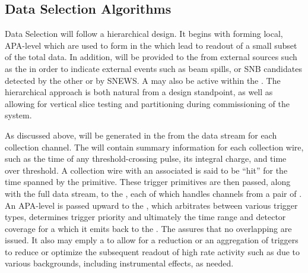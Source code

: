 \subsection{Data Selection Algorithms}
\label{sec:fdsp-daq-sel}




Data Selection will follow a hierarchical design. 
It begins with forming local, APA-level  which
are used to form   in the
 which lead to readout of a small subset of the total data. 
In addition,  will be provided to the
 from external sources such as the  in order to
indicate external events such as beam spills, or SNB candidates
detected by the other  or by SNEWS.
A  may also be active within the . 
The hierarchical approach is both natural from a design standpoint, as
well as allowing for vertical slice testing and partitioning during
commissioning of the system.

As discussed above,  will be generated in the
 from the data stream for each collection channel. 
The  will contain summary information for each
collection wire, such as the time of any threshold-crossing pulse, its
integral charge, and time over threshold. 
A collection wire with an associated  is said to
be ``hit'' for the time spanned by the primitive. 
These trigger primitives are then passed, along with the full data
stream, to the , each of which handles channels from a pair
of . 
An APA-level  is passed upward to the
, which arbitrates between various trigger types,
determines trigger priority and ultimately the time range and detector
coverage for a  which it emits back to the
.
The  assures that no overlapping  are
issued.
It also may emply a  to allow for a reduction or an
aggregation of triggers to reduce or optimize the subsequent readout
of high rate activity such as due to various backgrounds, including
instrumental effects, as needed.

